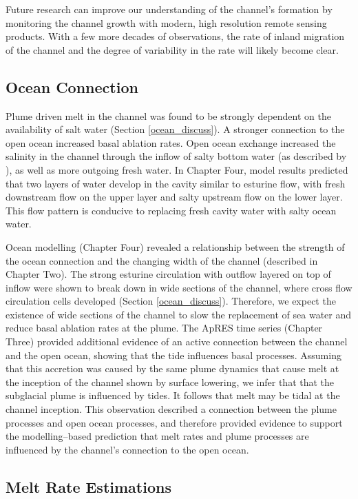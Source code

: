 Future research can improve our understanding of the channel's formation by monitoring the channel growth with modern, high resolution remote sensing products. With a few more decades of observations, the rate of inland migration of the channel and the degree of variability in the rate will likely become clear.

\subsection{Ocean Connection}

Plume driven melt in the channel was found to be strongly dependent on the availability of salt water (Section \ref{ocean_discuss}).   A stronger connection to the open ocean increased basal ablation rates.  Open ocean exchange increased the salinity in the channel through the  inflow of salty bottom water (as described by \cite{goldberg2019accurately}), as well as more outgoing fresh water. In Chapter Four, model results predicted that two layers of water develop in the cavity similar to esturine flow, with fresh downstream flow on the upper layer and salty upstream flow on the lower layer. This flow pattern is conducive to replacing fresh cavity water with salty ocean water. 

Ocean modelling (Chapter Four) revealed a relationship between the strength of the ocean connection and the changing width of the channel (described in Chapter Two). The strong esturine circulation with outflow layered on top of inflow were shown to break down in wide sections of the channel, where cross flow circulation cells developed (Section \ref{ocean_discuss}). Therefore, we expect the existence of wide sections of the channel to slow the replacement of sea water and reduce basal ablation rates at the plume.
The ApRES time series (Chapter Three) provided additional evidence of an active connection between the channel and the open ocean, showing that the tide influences basal processes. Assuming that this accretion was caused by the same plume dynamics that cause melt at the inception of the channel shown by surface lowering, we infer that that the subglacial plume is influenced by tides. It follows that melt may be tidal at the channel inception.
This observation described a connection between the plume processes and open ocean processes, and therefore provided evidence to support the modelling--based prediction that melt rates and plume processes are influenced by the channel's connection to the open ocean. 

\subsection{Melt Rate Estimations}

